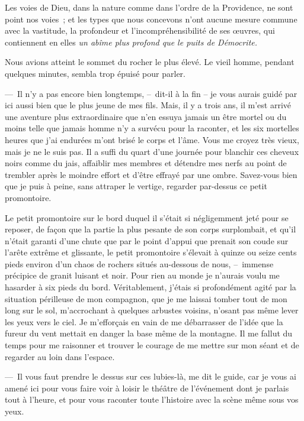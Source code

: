 \documentclass[french,twoside]{book} %
\newcommand{\bibl}[1]{{\RaggedLeft{#1}\par\bigskip}}
\begin{document}
\noindent Les voies de Dieu, dans la nature comme dans l’ordre de la Providence, ne sont point nos voies ; et les types que nous concevons n’ont aucune mesure commune avec la vastitude, la profondeur et l’incompréhensibilité de ses œuvres, qui contiennent en elles \emph{un abîme plus profond que le puits de Démocrite.}\par

\bibl{Joseph Glanvill.}
\noindent Nous avions atteint le sommet du rocher le plus élevé. Le vieil homme, pendant quelques minutes, sembla trop épuisé pour parler.\par
— Il n’y a pas encore bien longtemps, – dit-il à la fin – je vous aurais guidé par ici aussi bien que le plus jeune de mes fils. Mais, il y a trois ans, il m’est arrivé une aventure plus extraordinaire que n’en essuya jamais un être mortel ou du moins telle que jamais homme n’y a survécu pour la raconter, et les six mortelles heures que j’ai endurées m’ont brisé le corps et l’âme. Vous me croyez très vieux, mais je ne le suis pas. Il a suffi du quart d’une journée pour blanchir ces cheveux noirs comme du jais, affaiblir mes membres et détendre mes nerfs au point de trembler après le moindre effort et d’être effrayé par une ombre. Savez-vous bien que je puis à peine, sans attraper le vertige, regarder par-dessus ce petit promontoire.\par
Le petit promontoire sur le bord duquel il s’était si négligemment jeté pour se reposer, de façon que la partie la plus pesante de son corps surplombait, et qu’il n’était garanti d’une chute que par le point d’appui que prenait son coude sur l’arête extrême et glissante, le petit promontoire s’élevait à quinze ou seize cents pieds environ d’un chaos de rochers situés au-dessous de nous, – immense précipice de granit luisant et noir. Pour rien au monde je n’aurais voulu me hasarder à six pieds du bord. Véritablement, j’étais si profondément agité par la situation périlleuse de mon compagnon, que je me laissai tomber tout de mon long sur le sol, m’accrochant à quelques arbustes voisins, n’osant pas même lever les yeux vers le ciel. Je m’efforçais en vain de me débarrasser de l’idée que la fureur du vent mettait en danger la base même de la montagne. Il me fallut du temps pour me raisonner et trouver le courage de me mettre sur mon séant et de regarder au loin dans l’espace.\par
— Il vous faut prendre le dessus sur ces lubies-là, me dit le guide, car je vous ai amené ici pour vous faire voir à loisir le théâtre de l’événement dont je parlais tout à l’heure, et pour vous raconter toute l’histoire avec la scène même sous vos yeux.\par
\end{document}
